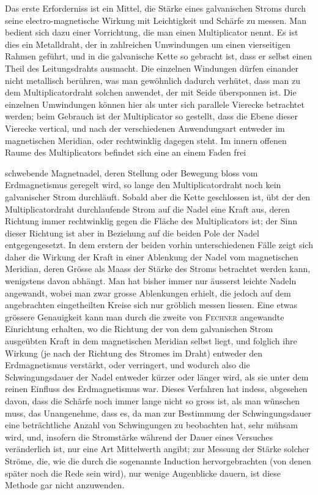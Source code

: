 Das erste Erforderniss ist ein Mittel, die Stärke eines galvanischen Stroms durch seine electro-magnetische Wirkung mit Leichtigkeit und Schärfe zu messen. Man bedient sich dazu einer Vorrichtung, die man einen Multiplicator nennt. Es ist dies ein Metalldraht, der in zahlreichen Umwindungen um einen vierseitigen Rahmen geführt, und in die galvanische Kette so gebracht ist, dass er selbst einen Theil des Leitungsdrahts ausmacht. Die einzelnen Windungen dürfen einander nicht metallisch berühren, was man gewöhnlich dadurch verhütet, dass man zu dem Multiplicatordraht solchen anwendet, der mit Seide übersponnen ist. Die einzelnen Umwindungen können hier als unter sich parallele Vierecke betrachtet werden; beim Gebrauch ist der Multiplicator so gestellt, dass die Ebene dieser Vierecke vertical, und nach der verschiedenen Anwendungsart entweder im magnetischen Meridian, oder rechtwinklig dagegen steht. Im innern offenen Raume des Multiplicators befindet sich eine an einem Faden frei
\par\clearpage
{}
\noindent schwebende Magnetnadel, deren Stellung oder Bewegung bloss vom Erdmagnetismus geregelt wird, so lange den Multiplicatordraht noch kein galvanischer Strom durchläuft. Sobald aber die Kette geschlossen ist, übt der den Multiplicatordraht durchlaufende Strom auf die Nadel eine Kraft aus, deren Richtung immer rechtwinklig gegen die Fläche des Multiplicators ist; der Sinn dieser Richtung ist aber in Beziehung auf die beiden Pole der Nadel entgegengesetzt. In dem erstern der beiden vorhin unterschiedenen Fälle zeigt sich daher die Wirkung der Kraft in einer Ablenkung der Nadel vom magnetischen Meridian, deren Grösse als Maass der Stärke des Stroms betrachtet werden kann, wenigstens davon abhängt. Man hat bisher immer nur äusserst leichte Nadeln angewandt, wobei man zwar grosse Ablenkungen erhielt, die jedoch auf dem angebrachten eingetheilten Kreise sich nur gröblich messen liessen. Eine etwas grössere Genauigkeit kann man durch die zweite von \textsc{Fechner} angewandte Einrichtung erhalten, wo die Richtung der von dem galvanischen Strom ausgeübten Kraft in dem magnetischen Meridian selbst liegt, und folglich ihre Wirkung (je nach der Richtung des Stromes im Draht) entweder den Erdmagnetismus verstärkt, oder verringert, und wodurch also die Schwingungsdauer der Nadel entweder kürzer oder länger wird, als sie unter dem reinen Einfluss des Erdmagnetismus war. Dieses Verfahren hat indess, abgesehen davon, dass die Schärfe noch immer lange nicht so gross ist, als man wünschen muss, das Unangenehme, dass es, da man zur Bestimmung der Schwingungsdauer eine beträchtliche Anzahl von Schwingungen zu beobachten hat, sehr mühsam wird, und, insofern die Stromstärke während der Dauer eines Versuches veränderlich ist, nur eine Art Mittelwerth angibt; zur Messung der Stärke solcher Ströme, die, wie die durch die sogenannte Induction hervorgebrachten (von denen später noch die Rede sein wird), nur wenige Augenblicke dauern, ist diese Methode gar nicht anzuwenden.

